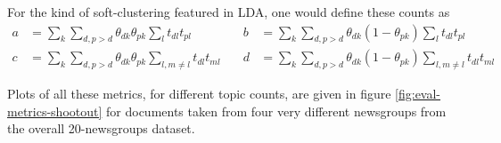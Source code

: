 For the kind of soft-clustering featured in LDA, one would define these counts as
\begin{equation}
\begin{aligned}
a & = \sum_k \sum_{d, {p>d}} \theta_{dk} \theta_{pk} \sum_l t_{dl}t_{pl} & \quad
b & = \sum_k \sum_{d, {p>d}} \theta_{dk} (1 -\theta_{pk}) \sum_l t_{dl}t_{pl}\\
c & = \sum_k \sum_{d, {p>d}} \theta_{dk} \theta_{pk} \sum_{l,m \neq l} t_{dl}t_{ml} & \quad
d & = \sum_k \sum_{d, {p>d}} \theta_{dk} (1- \theta_{pk}) \sum_{l,m \neq l} t_{dl}t_{ml}
\end{aligned}
\end{equation}

Plots of all these metrics, for different topic counts, are given in figure \ref{fig:eval-metrics-shootout} for documents taken from four very different newsgroups from the overall 20-newsgroups dataset.




